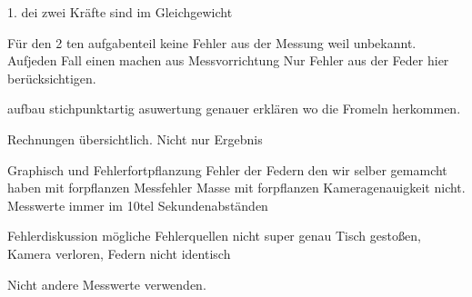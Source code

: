 1.  dei zwei Kräfte sind im Gleichgewicht

Für den 2 ten aufgabenteil keine Fehler aus der Messung weil unbekannt. Aufjeden Fall einen machen aus Messvorrichtung
Nur Fehler aus der Feder hier berücksichtigen.

aufbau stichpunktartig 
asuwertung genauer
erklären wo die Fromeln herkommen.

Rechnungen übersichtlich. Nicht nur Ergebnis

Graphisch und Fehlerfortpflanzung
Fehler der Federn den wir selber gemamcht haben mit forpflanzen
Messfehler Masse mit forpflanzen
Kameragenauigkeit nicht. Messwerte immer im 10tel Sekundenabständen

Fehlerdiskussion mögliche Fehlerquellen nicht super genau 
Tisch gestoßen, Kamera verloren, Federn nicht identisch

Nicht andere Messwerte verwenden.